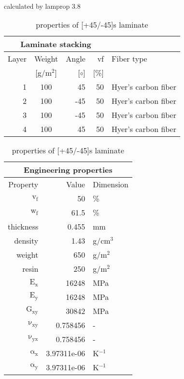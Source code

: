 \begin{table}[!htbp]
  \renewcommand{\arraystretch}{1.2}
  \caption{\label{tab:[+45/-45]s laminate}properties of [+45/-45]s laminate}
  \centering\footnotesize{\rule{0pt}{10pt}
  \tiny calculated by lamprop 3.8\\[3pt]}
    \begin{tabular}[t]{rcrrl}
      \multicolumn{4}{c}{\small\textbf{Laminate stacking}}\\[0.1em]
      \toprule %
      Layer & Weight & Angle & vf & Fiber type\\
            & [g/m$^2$] & [$\circ$] & [\%]\\
      \midrule
      1 &  100 &    45 & 50 & Hyer's carbon fiber\\
      2 &  100 &   -45 & 50 & Hyer's carbon fiber\\
      3 &  100 &   -45 & 50 & Hyer's carbon fiber\\
      4 &  100 &    45 & 50 & Hyer's carbon fiber\\
      \bottomrule
    \end{tabular}\hspace{0.02\textwidth}
    \begin{tabular}[t]{rrl}
      \multicolumn{3}{c}{\small\textbf{Engineering properties}}\\[0.1em]
      \toprule
      Property & Value & Dimension\\
      \midrule
      $\mathrm{v_f}$ & 50 &\%\\
      $\mathrm{w_f}$ & 61.5 &\%\\
      thickness & 0.455 & mm\\
      density & 1.43 & g/cm$^3$\\
      weight & 650 & g/m$^2$\\
      resin & 250 & g/m$^2$\\
      \midrule
      $\mathrm{E_x}$ &    16248 & MPa\\
      $\mathrm{E_y}$ &    16248 & MPa\\
      $\mathrm{G_{xy}}$ &    30842 & MPa\\
      $\mathrm{\nu_{xy}}$ & 0.758456 &-\\
      $\mathrm{\nu_{yx}}$ & 0.758456 &-\\
      $\mathrm{\alpha_x}$ & 3.97311e-06 & K$^{-1}$\\
      $\mathrm{\alpha_y}$ & 3.97311e-06 & K$^{-1}$\\
      \bottomrule
    \end{tabular}

\end{table}
